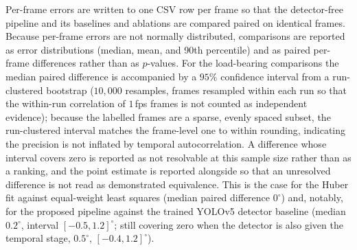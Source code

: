 Per-frame errors are written to one CSV row per frame so that the detector-free pipeline and its baselines
and ablations are compared paired on identical frames. Because per-frame errors are not normally distributed,
comparisons are reported as error distributions (median, mean, and 90th percentile) and as paired per-frame
differences rather than as $p$-values. For the load-bearing comparisons the median paired difference is
accompanied by a $95\%$ confidence interval from a run-clustered bootstrap ($10{,}000$ resamples, frames
resampled within each run so that the within-run correlation of $1$\,fps frames is not counted as
independent evidence); because the labelled frames are a sparse, evenly spaced subset, the run-clustered
interval matches the frame-level one to within rounding, indicating the precision is not inflated by
temporal autocorrelation. A difference whose interval covers zero is reported as not resolvable at this
sample size rather than as a ranking, and the point estimate is reported alongside so that an unresolved
difference is not read as demonstrated equivalence. This is the case for the Huber fit against
equal-weight least squares (median paired difference $0^\circ$) and, notably, for the proposed pipeline
against the trained YOLOv5 detector baseline (median $0.2^\circ$, interval $[-0.5,1.2]^\circ$; still
covering zero when the detector is also given the temporal stage, $0.5^\circ$, $[-0.4,1.2]^\circ$).